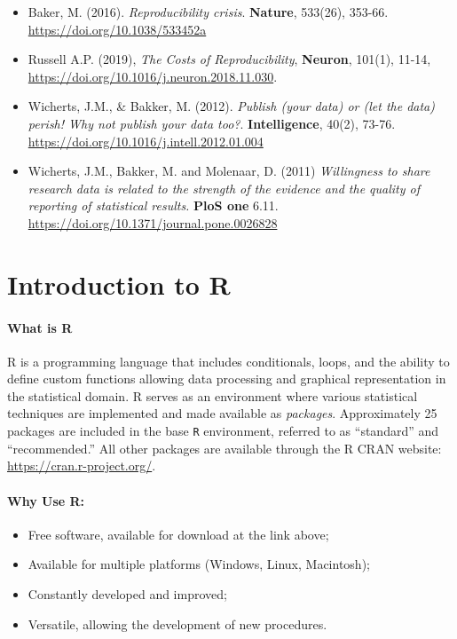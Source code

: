 \documentclass[
]{article}
\providecommand{\tightlist}{%
  \setlength{\itemsep}{0pt}\setlength{\parskip}{0pt}}
\begin{document}
\begin{itemize}
\tightlist
\item
  Baker, M. (2016). \emph{Reproducibility crisis}. \textbf{Nature},
  533(26), 353-66. \url{https://doi.org/10.1038/533452a}
\item
  Russell A.P. (2019), \emph{The Costs of Reproducibility},
  \textbf{Neuron}, 101(1), 11-14,
  \url{https://doi.org/10.1016/j.neuron.2018.11.030}.
\item
  Wicherts, J.M., \& Bakker, M. (2012). \emph{Publish (your data) or
  (let the data) perish! Why not publish your data too?}.
  \textbf{Intelligence}, 40(2), 73-76.
  \url{https://doi.org/10.1016/j.intell.2012.01.004}
\item
  Wicherts, J.M., Bakker, M. and Molenaar, D. (2011) \emph{Willingness
  to share research data is related to the strength of the evidence and
  the quality of reporting of statistical results.} \textbf{PloS one}
  6.11. \url{https://doi.org/10.1371/journal.pone.0026828}
\end{itemize}

\hypertarget{introduction-to-r}{%
\section{Introduction to R}\label{introduction-to-r}}

\hypertarget{what-is-r}{%
\paragraph{What is R}\label{what-is-r}}

R is a programming language that includes conditionals, loops, and the
ability to define custom functions allowing data processing and
graphical representation in the statistical domain. R serves as an
environment where various statistical techniques are implemented and
made available as \emph{packages}. Approximately 25 packages are
included in the base \texttt{R} environment, referred to as ``standard''
and ``recommended.'' All other packages are available through the R CRAN
website: \url{https://cran.r-project.org/}.

\hypertarget{why-use-r}{%
\paragraph{Why Use R:}\label{why-use-r}}

\begin{itemize}
\tightlist
\item
  Free software, available for download at the link above;
\item
  Available for multiple platforms (Windows, Linux, Macintosh);
\item
  Constantly developed and improved;
\item
  Versatile, allowing the development of new procedures.
\end{itemize}
\end{document}
